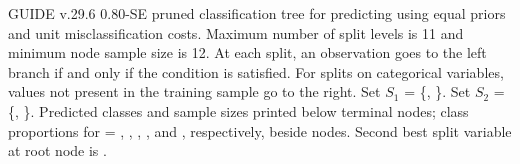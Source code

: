 \documentclass[12pt]{article}
\begin{document}
GUIDE v.29.6  0.80-SE pruned
classification tree for predicting \texttt{} using
equal priors
and unit misclassification costs.
Maximum number of split levels is 11 and minimum node sample size is 12.
At each split, an observation goes to the left branch 
 if and only if the condition is satisfied.
For splits on categorical variables,
 values not present in the training sample go to the right.
Set $S_{1}$ = \{\texttt{}, \texttt{}\}.
Set $S_{2}$ = \{\texttt{}, \texttt{}\}.
Predicted classes and sample sizes printed below terminal nodes;
 class proportions for \texttt{} =
 \texttt{}, \texttt{}, \texttt{}, \texttt{}, and \texttt{}, respectively, beside nodes.
Second best split variable at root node is \texttt{}.
 
\end{document}
